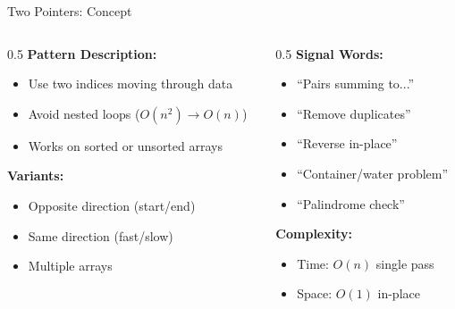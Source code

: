 \documentclass[aspectratio=169,xcolor=dvipsnames]{beamer}
\begin{document}
\begin{frame}{Two Pointers: Concept}
  \begin{columns}
    \begin{column}{0.5\textwidth}
      \textbf{Pattern Description:}
      \begin{itemize}
        \item Use two indices moving through data
        \item Avoid nested loops ($O(n^2) \to O(n)$)
        \item Works on sorted or unsorted arrays
      \end{itemize}

      \vspace{0.3cm}
      \textbf{Variants:}
      \begin{itemize}
        \item Opposite direction (start/end)
        \item Same direction (fast/slow)
        \item Multiple arrays
      \end{itemize}
    \end{column}

    \begin{column}{0.5\textwidth}
      \textbf{Signal Words:}
      \begin{itemize}
        \item ``Pairs summing to...''
        \item ``Remove duplicates''
        \item ``Reverse in-place''
        \item ``Container/water problem''
        \item ``Palindrome check''
      \end{itemize}

      \vspace{0.3cm}
      \textbf{Complexity:}
      \begin{itemize}
        \item Time: $O(n)$ single pass
        \item Space: $O(1)$ in-place
      \end{itemize}
    \end{column}
  \end{columns}
\end{frame}
\end{document}
